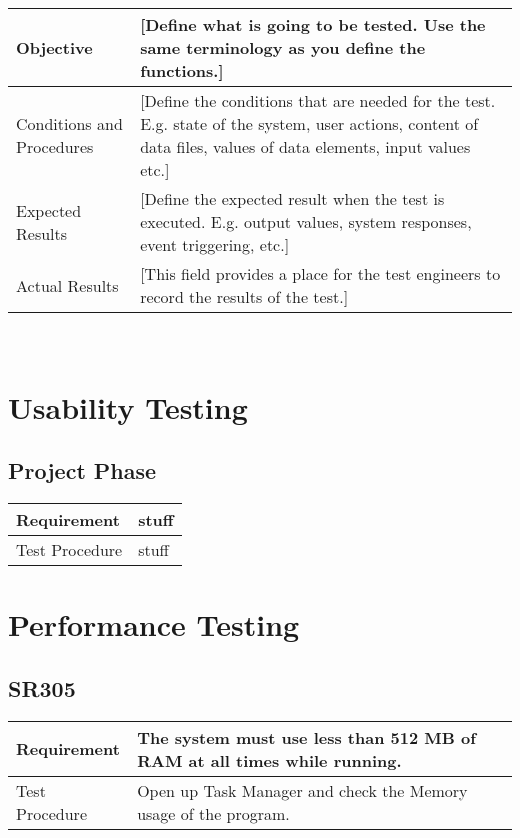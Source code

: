 \documentclass{article}
\begin{document}
\begin{tabular}{| l | p{12cm} |}
    \hline
	Objective & [Define what is going to be tested.  Use the same terminology as you define the functions.] \\ \hline
	Conditions and Procedures & [Define the conditions that are needed for the test.  E.g. state of the system, user actions, content of data files, values of data elements, input values etc.] \\ \hline
	Expected Results & [Define the expected result when the test is executed.  E.g. output values, system responses, event triggering, etc.] \\ \hline
	Actual Results & [This field provides a place for the test engineers to record the results of the test.] \\ \hline
\end{tabular}

\hfill \\

\newpage

\section{Usability Testing}
\subsection{Project Phase}
\begin{tabular}{| l | p{12cm}  |}
    \hline
	Requirement & stuff \\ \hline
	Test Procedure & stuff \\ \hline
\end{tabular}

\newpage

\section{Performance Testing}
\subsection{SR305}
\begin{tabular}{| l | p{12cm}  |}
    \hline
	Requirement & The system must use less than 512 MB of RAM at all times while running. \\ \hline
	Test Procedure & Open up Task Manager and check the Memory usage of the program. \\ \hline
\end{tabular}
\end{document}
